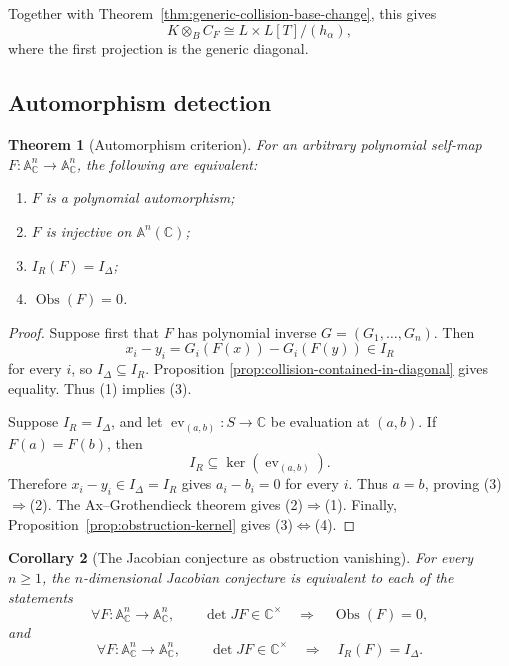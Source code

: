 \documentclass[11pt]{article}
\newtheorem{theorem}{Theorem}[section]
\newtheorem{corollary}[theorem]{Corollary}
\theoremstyle{remark}
\theoremstyle{definition}
\newcommand{\A}{\mathbb A}
\newcommand{\C}{\mathbb C}
\newcommand{\Obs}{\operatorname{Obs}}
\begin{document}
Together with Theorem~\ref{thm:generic-collision-base-change}, this gives
\[
  K\otimes_BC_F
  \cong
  L\times L[T]/(h_\alpha),
\]
where the first projection is the generic diagonal.

\subsection{Automorphism detection}
\label{sec:automorphism-detection}

\begin{theorem}[Automorphism criterion]
\label{thm:automorphism-criterion}
For an arbitrary polynomial self-map
\(F\colon\A^n_{\C}\to\A^n_{\C}\), the following are equivalent:
\begin{enumerate}[label=\textup{(\arabic*)}]
  \item \(F\) is a polynomial automorphism;
  \item \(F\) is injective on \(\A^n(\C)\);
  \item \(I_R(F)=I_\Delta\);
  \item \(\Obs(F)=0\).
\end{enumerate}
\end{theorem}

\begin{proof}
Suppose first that \(F\) has polynomial inverse
\(G=(G_1,\dots,G_n)\).  Then
\[
  x_i-y_i
  =
  G_i(F(x))-G_i(F(y))
  \in I_R
\]
for every \(i\), so \(I_\Delta\subseteq I_R\).  Proposition
\ref{prop:collision-contained-in-diagonal} gives equality.  Thus
\textup{(1)} implies \textup{(3)}.

Suppose \(I_R=I_\Delta\), and let
\(\operatorname{ev}_{(a,b)}\colon S\to\C\) be evaluation at
\((a,b)\).  If \(F(a)=F(b)\), then
\[
  I_R\subseteq\ker(\operatorname{ev}_{(a,b)}).
\]
Therefore \(x_i-y_i\in I_\Delta=I_R\) gives \(a_i-b_i=0\) for every
\(i\).  Thus \(a=b\), proving
\textup{(3)}\(\Rightarrow\)\textup{(2)}.  The
Ax--Grothendieck theorem \cite{Ax1969} gives
\textup{(2)}\(\Rightarrow\)\textup{(1)}.  Finally,
Proposition~\ref{prop:obstruction-kernel} gives
\textup{(3)}\(\Longleftrightarrow\)\textup{(4)}.
\end{proof}

\begin{corollary}[The Jacobian conjecture as obstruction vanishing]
\label{cor:jacobian-conjecture-as-vanishing}
For every \(n\geq1\), the \(n\)-dimensional Jacobian conjecture is
equivalent to each of the statements
\[
  \forall F\colon\A^n_{\C}\to\A^n_{\C},
  \qquad
  \det JF\in\C^\times
  \quad\Longrightarrow\quad
  \Obs(F)=0,
\]
and
\[
  \forall F\colon\A^n_{\C}\to\A^n_{\C},
  \qquad
  \det JF\in\C^\times
  \quad\Longrightarrow\quad
  I_R(F)=I_\Delta.
\]
\end{corollary}
\end{document}
